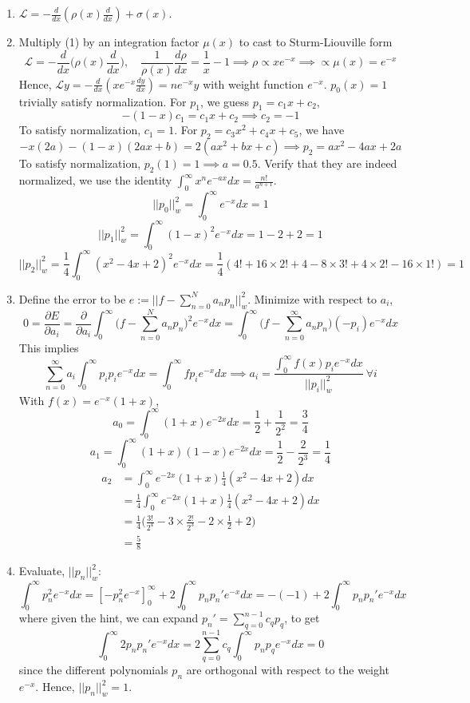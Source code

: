 \documentclass[a4paper]{article}
\begin{document}
\begin{ans}\leavevmode
\begin{enumerate}[label=(\alph*)]
\item $\mathcal{L}=-\frac{d}{dx}(\rho(x)\frac{d}{dx})+\sigma(x)$.
\item Multiply (1) by an integration factor $\mu(x)$ to cast to Sturm-Liouville form 
$$\mathcal{L}=-\frac{d}{dx}\bigg(\rho(x)\frac{d}{dx}\bigg),\quad \frac{1}{\rho(x)}\frac{d\rho}{dx}=\frac{1}{x}-1\implies\rho\propto xe^{-x}\implies\propto\mu(x)=e^{-x}$$
Hence, $\mathcal{L}y=-\frac{d}{dx}(xe^{-x}\frac{dy}{dx})=ne^{-x}y$ with weight function $e^{-x}$. $p_0(x)=1$ trivially satisfy normalization. For $p_1$, we guess $p_1=c_1x+c_2$,
$$-(1-x)c_1=c_1x+c_2\implies c_2=-1$$
To satisfy normalization, $c_1=1$. For $p_2=c_3x^2+c_4x+c_5$, we have
$$-x(2a)-(1-x)(2ax+b)=2(ax^2+bx+c)\implies p_2=ax^2-4ax+2a$$
To satisfy normalization, $p_2(1)=1\implies a=0.5$. Verify that they are indeed normalized, we use the identity $\int_0^\infty x^ne^{-ax}dx=\frac{n!}{a^{n+1}}$.
$$||p_0||_w^2=\int_0^\infty e^{-x}dx=1$$
$$||p_1||_w^2=\int_0^\infty (1-x)^2e^{-x}dx=1-2+2=1$$
$$||p_2||_w^2=\frac{1}{4}\int_0^\infty(x^2-4x+2)^2e^{-x}dx=\frac{1}{4}(4!+16\times 2!+4-8\times 3!+4\times 2!-16\times 1!)=1$$
\item Define the error to be $e:=||f-\sum_{n=0}^Na_np_n||^2_w$. Minimize with respect to $a_i$,
$$0=\frac{\partial E}{\partial a_i}=\frac{\partial}{\partial a_i}\int_0^\infty \bigg(f-\sum_{n=0}^Na_np_n\bigg)^2e^{-x}dx=\int_0^\infty\bigg(f-\sum_{n=0}^\infty a_np_n\bigg)(-p_i)e^{-x}dx$$
This implies $$\sum_{n=0}^\infty a_i\int_0^\infty p_ip_ie^{-x}dx=\int_0^\infty fp_ie^{-x}dx\implies a_i=\frac{\int_0^\infty f(x)p_ie^{-x}dx}{||p_i||^2_w}~\forall i$$ With $f(x)=e^{-x}(1+x)$, $$a_0=\int_0^\infty(1+x)e^{-2x}dx=\frac{1}{2}+\frac{1}{2^2}=\frac{3}{4}$$ $$a_1=\int_0^\infty(1+x)(1-x)e^{-2x}dx=\frac{1}{2}-\frac{2}{2^3}=\frac{1}{4}$$ 
\begin{align}
a_2&=\int_0^\infty e^{-2x}(1+x)\frac{1}{4}(x^2-4x+2)dx\nonumber\\&=\frac{1}{4}\int_0^\infty e^{-2x}(1+x)\frac{1}{4}(x^2-4x+2)dx\nonumber\\&=\frac{1}{4}\bigg(\frac{3!}{2^4}-3\times\frac{2!}{2^3}-2\times\frac{1}{2}+2\bigg)\nonumber\\&=\frac{5}{8}\nonumber
\end{align}
\item Evaluate, $||p_n||^2_w$:
$$\int_0^\infty p_n^2e^{-x}dx=[-p_n^2e^{-x}]_0^\infty +2\int_0^\infty p_np_n'e^{-x}dx=-(-1)+2\int_0^\infty p_np_n'e^{-x}dx$$
where given the hint, we can expand $p_n'=\sum_{q=0}^{n-1}c_qp_q$, to get
$$\int_0^\infty 2p_np_n'e^{-x}dx=2\sum_{q=0}^{n-1}c_q\int_0^\infty p_np_qe^{-x}dx=0$$
since the different polynomials $p_n$ are orthogonal with respect to the weight $e^{-x}$. Hence, $||p_n||^2_w=1$.
\end{enumerate}
\end{ans}
\end{document}

